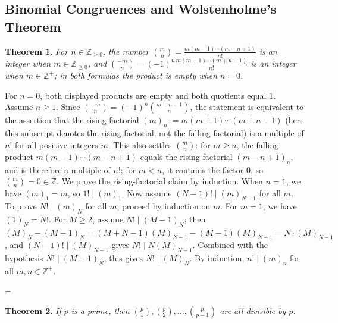 \documentclass[11pt]{article}
\makeatletter
\theoremstyle{ntstyle}
\newtheorem{theorem}{Theorem}[subsection]
\let\nt@closedisplay\]
\def\nt@guardedclose{\@ifnextchar\par{\nt@closeafterpar}{\@ifnextchar\end{\postdisplaypenalty\@M\nt@closedisplay}{\nt@closedisplay}}}
\def\nt@closeafterpar\par{\@ifnextchar\par{\nt@closeafterpar}{\@ifnextchar\end{\postdisplaypenalty\@M\nt@closedisplay\par}{\nt@closedisplay\par}}}
\renewenvironment{proof}[1][\proofname]{\par
  \pushQED{\qed}\normalfont\topsep\medskipamount\edef\nt@afterproof{\@endparpenalty=\the\@endparpenalty\relax}\@beginparpenalty\@M\@endparpenalty\@M\let\]\nt@guardedclose\trivlist\item[]\textit{#1\@addpunct{.}} \ignorespaces}{\ifvmode\addpenalty\@M\fi\popQED\nt@afterproof\endtrivlist\@endpefalse}
\makeatother
\begin{document}
\subsection{Binomial Congruences and Wolstenholme's Theorem}

\begin{theorem}\label{thm:3.5.1} For $n\in\mathbb{Z}_{\ge0}$,
	the number $\binom{m}{n} = \frac{m(m-1) \cdots (m-n+1)}{n!}$ is an integer when
	$m\in\mathbb{Z}_{\ge0}$, and $\binom{-m}{n}
		= (-1)^n \frac{m(m+1) \cdots (m+n-1)}{n!}$ is an integer when
	$m\in\mathbb{Z}^+$; in both formulas the product is empty when $n=0$.

\end{theorem}

\begin{proof} For $n=0$, both displayed products are empty and both quotients equal $1$. Assume $n\ge1$. Since $\binom{-m}{n} = (-1)^n
		\binom{m+n-1}{n}$, the statement is equivalent to the assertion that the rising factorial $(m)_n := m(m+1)
		\cdots (m+n-1)$ (here this subscript denotes the rising factorial, not the falling factorial) is a multiple of $n!$ for all positive integers
	$m$. This also settles $\binom{m}{n}$: for $m \ge n$, the falling product
	$m(m-1)\cdots(m-n+1)$ equals the rising factorial $(m-n+1)_n$, and is therefore a
	multiple of $n!$; for $m < n$, it contains the factor $0$, so
	$\binom{m}{n} = 0 \in \mathbb{Z}$. We prove the rising-factorial claim by induction. When $n = 1$, we have $(m)_1 =
		m$, so $1! \mid (m)_1$. Now assume $(N-1)! \mid
		(m)_{N-1}$ for all $m$. To prove $N! \mid (m)_N$ for all $m$, proceed by induction
	on $m$. For $m = 1$, we have $(1)_N = N!$. For $M \ge 2$, assume $N! \mid (M-1)_N$; then $(M)_N - (M-1)_N =
			(M+N-1)(M)_{N-1} - (M-1)(M)_{N-1} = N \cdot
		(M)_{N-1}$, and $(N-1)! \mid (M)_{N-1}$ gives $N! \mid N
			(M)_{N-1}$. Combined with the hypothesis $N! \mid (M-1)_N$, this gives $N! \mid (M)_N$. By
	induction, $n! \mid (m)_n$ for all $m, n \in \mathbb{Z}^+$.

\end{proof}
\begin{theorem}\label{thm:3.5.2} If $p$ is a prime, then $\binom{p}{1},
		\binom{p}{2}, \ldots, \binom{p}{p-1}$ are all divisible by $p$.

\end{theorem}
\end{document}
